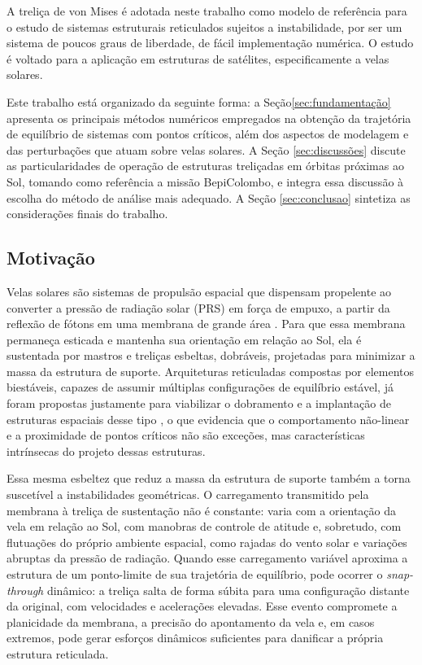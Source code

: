 A treliça de von Mises é adotada neste trabalho como modelo de referência para o estudo de sistemas estruturais reticulados sujeitos a instabilidade, por ser um sistema de poucos graus de liberdade, de fácil implementação numérica. O estudo é voltado para a aplicação em estruturas de satélites, especificamente a velas solares.

Este trabalho está organizado da seguinte forma: a Seção\ref{sec:fundamentação} apresenta os principais métodos numéricos empregados na obtenção da trajetória de equilíbrio de sistemas com pontos críticos, além dos aspectos de modelagem e das perturbações que atuam sobre velas solares. A Seção \ref{sec:discussões} discute as particularidades de operação de estruturas treliçadas em órbitas próximas ao Sol, tomando como referência a missão  BepiColombo, e integra essa discussão à escolha do método de análise mais adequado. A Seção \ref{sec:conclusao} sintetiza as considerações
finais do trabalho.


\subsection{Motivação}
\label{subsec:motivação}

Velas solares são sistemas de propulsão espacial que dispensam
propelente ao converter a pressão de radiação solar (PRS) em força
de empuxo, a partir da reflexão de fótons em uma membrana de grande
área \cite{silva2020}. Para que essa membrana permaneça esticada e
mantenha sua orientação em relação ao Sol, ela é sustentada por
mastros e treliças esbeltas, dobráveis, projetadas para minimizar a
massa da estrutura de suporte. Arquiteturas reticuladas compostas
por elementos biestáveis, capazes de assumir múltiplas configurações
de equilíbrio estável, já foram propostas justamente para viabilizar
o dobramento e a implantação de estruturas espaciais desse tipo
\cite{schioler_pellegrino2007}, o que evidencia que o comportamento
não-linear e a proximidade de pontos críticos não são exceções, mas
características intrínsecas do projeto dessas estruturas.

Essa mesma esbeltez que reduz a massa da estrutura de suporte também
a torna suscetível a instabilidades geométricas. O carregamento
transmitido pela membrana à treliça de sustentação não é constante:
varia com a orientação da vela em relação ao Sol, com manobras de
controle de atitude e, sobretudo, com flutuações do próprio ambiente
espacial, como rajadas do vento solar e variações abruptas da
pressão de radiação. Quando esse carregamento variável aproxima a
estrutura de um ponto-limite de sua trajetória de equilíbrio, pode
ocorrer o \textit{snap-through} dinâmico: a treliça salta de forma
súbita para uma configuração distante da original, com velocidades e
acelerações elevadas. Esse evento compromete a planicidade da
membrana, a precisão do apontamento da vela e, em casos extremos,
pode gerar esforços dinâmicos suficientes para danificar a própria
estrutura reticulada.

